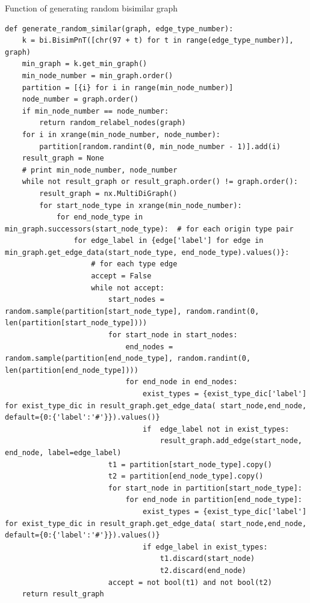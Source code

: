 \begin{code}
\caption{Function of generating random bisimilar graph}
\label{lst:genrdmsim}
\begin{verbatim}
def generate_random_similar(graph, edge_type_number):
    k = bi.BisimPnT([chr(97 + t) for t in range(edge_type_number)], graph)
    min_graph = k.get_min_graph()
    min_node_number = min_graph.order()
    partition = [{i} for i in range(min_node_number)]
    node_number = graph.order()
    if min_node_number == node_number:
        return random_relabel_nodes(graph)
    for i in xrange(min_node_number, node_number):
        partition[random.randint(0, min_node_number - 1)].add(i)
    result_graph = None
    # print min_node_number, node_number
    while not result_graph or result_graph.order() != graph.order():
        result_graph = nx.MultiDiGraph()
        for start_node_type in xrange(min_node_number):
            for end_node_type in min_graph.successors(start_node_type):  # for each origin type pair
                for edge_label in {edge['label'] for edge in min_graph.get_edge_data(start_node_type, end_node_type).values()}:
                    # for each type edge
                    accept = False
                    while not accept:
                        start_nodes = random.sample(partition[start_node_type], random.randint(0, len(partition[start_node_type])))
                        for start_node in start_nodes:
                            end_nodes = random.sample(partition[end_node_type], random.randint(0, len(partition[end_node_type])))
                            for end_node in end_nodes:
                                exist_types = {exist_type_dic['label'] for exist_type_dic in result_graph.get_edge_data( start_node,end_node, default={0:{'label':'#'}}).values()}
                                if  edge_label not in exist_types:
                                    result_graph.add_edge(start_node, end_node, label=edge_label)
                        t1 = partition[start_node_type].copy()
                        t2 = partition[end_node_type].copy()
                        for start_node in partition[start_node_type]:
                            for end_node in partition[end_node_type]:
                                exist_types = {exist_type_dic['label'] for exist_type_dic in result_graph.get_edge_data( start_node,end_node, default={0:{'label':'#'}}).values()}
                                if edge_label in exist_types:
                                    t1.discard(start_node)
                                    t2.discard(end_node)
                        accept = not bool(t1) and not bool(t2)
    return result_graph
\end{verbatim}
\end{code}


